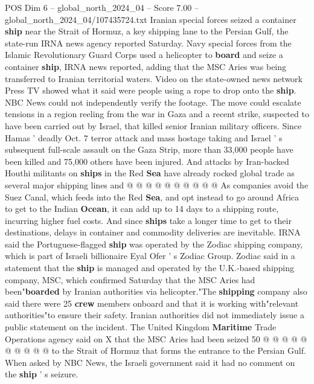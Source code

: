 \begin{textsample}{POS Dim 6 – global\_north\_2024\_04 – Score 7.00 – global\_north\_2024\_04/107435724.txt}  \label{ex:f6_pos_120}
Iranian special forces seized a container \textbf{ship} near the Strait of Hormuz, a key shipping lane to the Persian Gulf, the state-run IRNA news agency reported Saturday.
Navy special forces from the Islamic Revolutionary Guard Corps used a helicopter to \textbf{board} and seize a container \textbf{ship}, IRNA news reported, adding that the MSC Aries was being transferred to Iranian territorial waters.
Video on the state-owned news network Press TV showed what it said were people using a rope to drop onto the \textbf{ship}.
NBC News could not independently verify the footage.
The move could escalate tensions in a region reeling from the war in Gaza and a recent strike, suspected to have been carried out by Israel, that killed senior Iranian military officers.
Since Hamas ' deadly Oct. 7 terror attack and mass hostage taking and Israel ' s subsequent full-scale assault on the Gaza Strip, more than 33,000 people have been killed and 75,000 others have been injured.
And attacks by Iran-backed Houthi militants on \textbf{ships} in the Red \textbf{Sea} have already rocked global trade as several major shipping lines and @ @ @ @ @ @ @ @ @ @ As companies avoid the Suez Canal, which feeds into the Red \textbf{Sea}, and opt instead to go around Africa to get to the Indian \textbf{Ocean}, it can add up to 14 days to a shipping route, incurring higher fuel costs.
And since \textbf{ships} take a longer time to get to their destinations, delays in container and commodity deliveries are inevitable.
IRNA said the Portuguese-flagged \textbf{ship} was operated by the Zodiac shipping company, which is part of Israeli billionaire Eyal Ofer ' s Zodiac Group.
Zodiac said in a statement that the \textbf{ship} is managed and operated by the U.K.-based shipping company, MSC, which confirmed Saturday that the MSC Aries had been"\textbf{boarded} by Iranian authorities via helicopter."The \textbf{shipping} company also said there were 25 \textbf{crew} members onboard and that it is working with"relevant authorities"to ensure their safety.
Iranian authorities did not immediately issue a public statement on the incident.
The United Kingdom \textbf{Maritime} Trade Operations agency said on X that the MSC Aries had been seized 50 @ @ @ @ @ @ @ @ @ @ to the Strait of Hormuz that forms the entrance to the Persian Gulf.
When asked by NBC News, the Israeli government said it had no comment on the \textbf{ship} ' s seizure.

\end{textsample}
